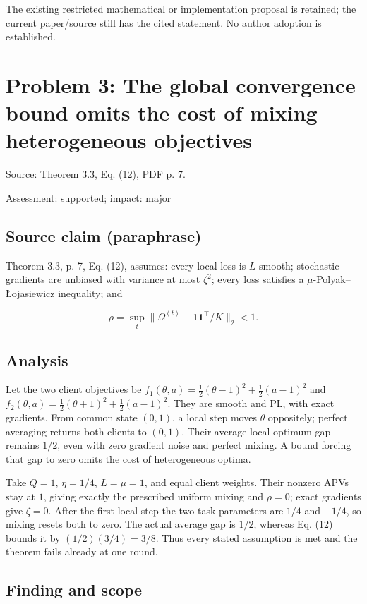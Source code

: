 \documentclass[11pt]{article}
\begin{document}
The existing restricted mathematical or implementation proposal is retained; the current paper/source still has the cited statement. No author adoption is established.

\section*{Problem 3: The global convergence bound omits the cost of mixing heterogeneous objectives}

Source: Theorem 3.3, Eq. (12), PDF p. 7.

Assessment: supported; impact: major

\subsection*{Source claim (paraphrase)}

Theorem 3.3, p. 7, Eq. (12), assumes: every local loss is \(L\)-smooth; stochastic gradients are unbiased with variance at most \(\zeta^2\); every loss satisfies a \(\mu\)-Polyak–Łojasiewicz inequality; and

\[ \rho=\sup_t\|\Omega^{(t)}-\mathbf1\mathbf1^\top/K\|_2<1. \]

\subsection*{Analysis}

Let the two client objectives be \(f_1(\theta,a)=\tfrac12(\theta-1)^2+\tfrac12(a-1)^2\) and \(f_2(\theta,a)=\tfrac12(\theta+1)^2+\tfrac12(a-1)^2\). They are smooth and PL, with exact gradients. From common state \((0,1)\), a local step moves \(\theta\) oppositely; perfect averaging returns both clients to \((0,1)\). Their average local-optimum gap remains \(1/2\), even with zero gradient noise and perfect mixing. A bound forcing that gap to zero omits the cost of heterogeneous optima.

Take \(Q=1\), \(\eta=1/4\), \(L=\mu=1\), and equal client weights. Their nonzero APVs stay at \(1\), giving exactly the prescribed uniform mixing and \(\rho=0\); exact gradients give \(\zeta=0\). After the first local step the two task parameters are \(1/4\) and \(-1/4\), so mixing resets both to zero. The actual average gap is \(1/2\), whereas Eq. (12) bounds it by \((1/2)(3/4)=3/8\). Thus every stated assumption is met and the theorem fails already at one round.

\subsection*{Finding and scope}
\end{document}
